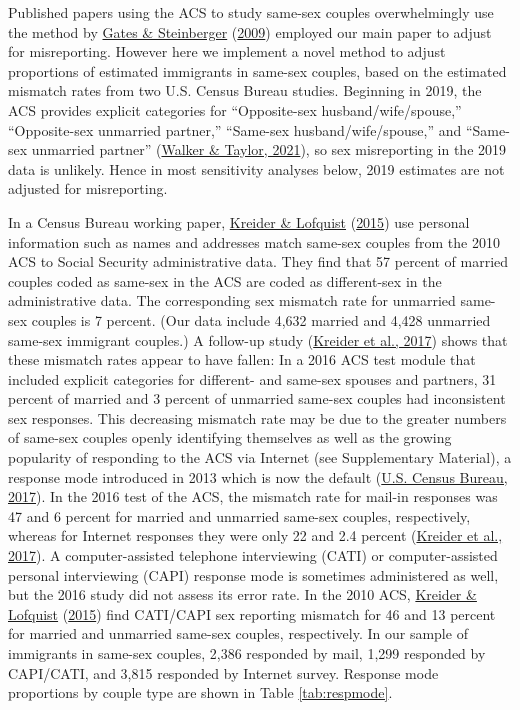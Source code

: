 \documentclass[
  11pt,
]{article}
\begin{document}
Published papers using the ACS to study same-sex couples overwhelmingly use the method by \protect\hyperlink{ref-gates_2009}{Gates \& Steinberger} (\protect\hyperlink{ref-gates_2009}{2009}) employed our main paper to adjust for misreporting. However here we implement a novel method to adjust proportions of estimated immigrants in same-sex couples, based on the estimated mismatch rates from two U.S. Census Bureau studies. Beginning in 2019, the ACS provides explicit categories for ``Opposite-sex husband/wife/spouse,'' ``Opposite-sex unmarried partner,'' ``Same-sex husband/wife/spouse,'' and ``Same-sex unmarried partner'' (\protect\hyperlink{ref-walker_2021}{Walker \& Taylor, 2021}), so sex misreporting in the 2019 data is unlikely. Hence in most sensitivity analyses below, 2019 estimates are not adjusted for misreporting.

In a Census Bureau working paper, \protect\hyperlink{ref-kreider_2015}{Kreider \& Lofquist} (\protect\hyperlink{ref-kreider_2015}{2015}) use personal information such as names and addresses match same-sex couples from the 2010 ACS to Social Security administrative data. They find that 57 percent of married couples coded as same-sex in the ACS are coded as different-sex in the administrative data. The corresponding sex mismatch rate for unmarried same-sex couples is 7 percent. (Our data include 4,632 married and 4,428 unmarried same-sex immigrant couples.) A follow-up study (\protect\hyperlink{ref-kreider_2017}{Kreider et al., 2017}) shows that these mismatch rates appear to have fallen: In a 2016 ACS test module that included explicit categories for different- and same-sex spouses and partners, 31 percent of married and 3 percent of unmarried same-sex couples had inconsistent sex responses. This decreasing mismatch rate may be due to the greater numbers of same-sex couples openly identifying themselves as well as the growing popularity of responding to the ACS via Internet (see Supplementary Material), a response mode introduced in 2013 which is now the default (\protect\hyperlink{ref-u.s.censusbureau_2017}{U.S. Census Bureau, 2017}). In the 2016 test of the ACS, the mismatch rate for mail-in responses was 47 and 6 percent for married and unmarried same-sex couples, respectively, whereas for Internet responses they were only 22 and 2.4 percent (\protect\hyperlink{ref-kreider_2017}{Kreider et al., 2017}). A computer-assisted telephone interviewing (CATI) or computer-assisted personal interviewing (CAPI) response mode is sometimes administered as well, but the 2016 study did not assess its error rate. In the 2010 ACS, \protect\hyperlink{ref-kreider_2015}{Kreider \& Lofquist} (\protect\hyperlink{ref-kreider_2015}{2015}) find CATI/CAPI sex reporting mismatch for 46 and 13 percent for married and unmarried same-sex couples, respectively. In our sample of immigrants in same-sex couples, 2,386 responded by mail, 1,299 responded by CAPI/CATI, and 3,815 responded by Internet survey. Response mode proportions by couple type are shown in Table \ref{tab:respmode}.
\end{document}
